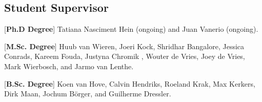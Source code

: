 \documentclass[print]{styles/friggeri-cv-mac} %
\begin{document}
\subsection{Student Supervisor}\vspace{-5pt}


\begin{entrylist}
\vspace{-0.3cm}
\entry
{[\textbf{Ph.D Degree}]}
{\textnormal{Tatiana Nasciment Hein (ongoing) and Juan Vanerio (ongoing).}}
{}

\entry
{[\textbf{M.Sc. Degree}]}
{\textnormal{Huub van Wieren, Joeri Kock, Shridhar Bangalore, Jessica Conrads, Kareem Fouda, Justyna Chromik , Wouter de Vries, Joey de Vries, Mark Wierbosch, and Jarmo van Lenthe.}}
{}

\vspace{-0.3cm}
\entry
{[\textbf{B.Sc. Degree}]}
{\textnormal{Koen van Hove, Calvin Hendriks, Roeland Krak, Max Kerkers, Dirk Maan, Jochum Börger, and Guilherme Dressler.}} 
{}

\end{entrylist}


\end{document}
